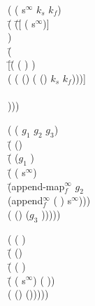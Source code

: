 
\begin{ZZZZschemedisplay}%
( ( s$^\infty$ $k_s$ $k_f$)\\%
\PRN \HL \=( \=(\=[ ( s$^\infty$)]\\%
  \>     \> )\\%
  \>\HL \HL \=(\\%
  \>  \>\PRN \HL \=[\=( ( ) )\\%
  \>  \>  \> \>( ( () ( () $k_s$ $k_f$)))]\\%
  \>  \>  \>[(\va{null?} \va{ss}) ($k_f$)]\\%
  \>  \>  )))
\end{ZZZZschemedisplay}

\begin{ZZZZschemedisplay}%
( ( $g_1$ $g_2$ $g_3$)\\%
\PRN \HL \=( ()\\%
  \>\PRN \HL \=( ($g_1$ )\\%
  \>  \>\PRN \HL \=( ( s$^\infty$)\\%
  \>  \>  \>\PRN \HL \=(append-map$^\infty_f$ $g_2$\\%
  \>  \>  \>  \>\PRN \HL (append$^\infty_f$ ( ) s$^\infty$)))\\%
  \>  \>  \>( () ($g_3$ )))))
\end{ZZZZschemedisplay}

\begin{ZZZZschemedisplay}%
( ( )\\%
\PRN \HL \=( ()\\%
  \>\PRN \HL \=( ( )\\%
  \>  \>\PRN \HL \=( ( s$^\infty$) ( ))\\%
  \>  \>  \>( () ()))))%
\end{ZZZZschemedisplay}
